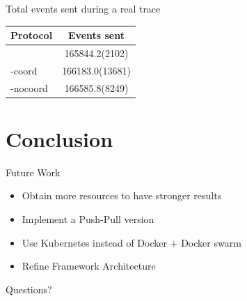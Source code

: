 \begin{frame}{Total events sent during a real trace}
	\begin{table}
		\centering
		\begin{tabular}{lS}
			\toprule
			Protocol & {Events sent}\\
			\midrule
			\epto & 165844.2(2102)\\
			\jgroups-coord & 166183.0(13681)\\
			\jgroups-nocoord & 166585.8(8249)\\
			\bottomrule
		\end{tabular}
	\end{table}
\end{frame}

\section{Conclusion}
\subtitle[Conclusion]{Conclusion}

\begin{frame}{Future Work}
    \begin{itemize}
        \item Obtain more resources to have stronger results
        \item Implement a Push-Pull \epto{} version
        \item Use Kubernetes instead of Docker + Docker swarm
        \item Refine Framework Architecture
    \end{itemize}
\end{frame}

\begin{frame}[standout]
	Questions?
\end{frame}




